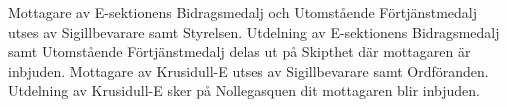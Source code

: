 \documentclass[10pt]{article}
\begin{document}
Mottagare av E-sektionens Bidragsmedalj och Utomstående Förtjänstmedalj utses av Sigillbevarare samt Styrelsen. Utdelning av E-sektionens Bidragsmedalj samt Utomstående Förtjänstmedalj delas ut på Skipthet där mottagaren är inbjuden.
Mottagare av Krusidull-E utses av Sigillbevarare samt Ordföranden. Utdelning av Krusidull-E sker på Nollegasquen dit mottagaren blir inbjuden.
\end{document}
